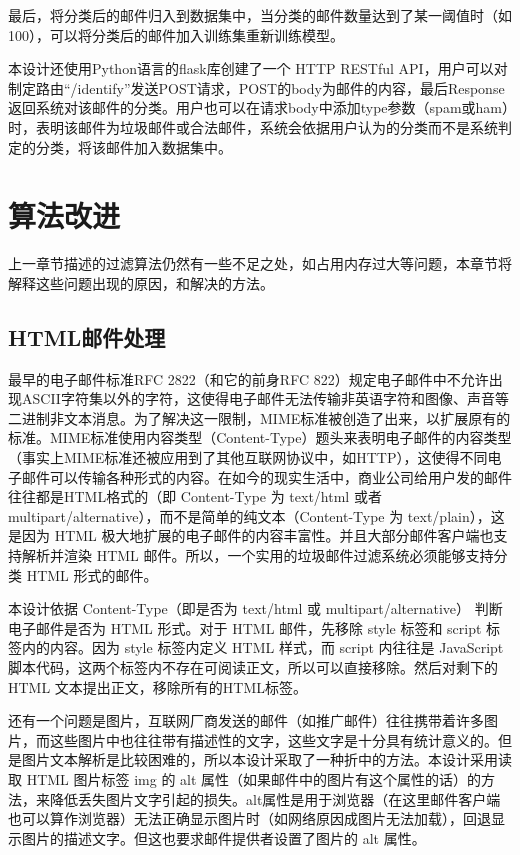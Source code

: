 \documentclass[UTF8,zihao=-4]{ctexart}
\begin{document}
	最后，将分类后的邮件归入到数据集中，当分类的邮件数量达到了某一阈值时（如100），可以将分类后的邮件加入训练集重新训练模型。
	
	本设计还使用Python语言的flask库创建了一个 HTTP RESTful API，用户可以对制定路由“/identify”发送POST请求，POST的body为邮件的内容，最后Response返回系统对该邮件的分类。用户也可以在请求body中添加type参数（spam或ham）时，表明该邮件为垃圾邮件或合法邮件，系统会依据用户认为的分类而不是系统判定的分类，将该邮件加入数据集中。

\newpage
\section{算法改进}
	上一章节描述的过滤算法仍然有一些不足之处，如占用内存过大等问题，本章节将解释这些问题出现的原因，和解决的方法。
\subsection{HTML邮件处理}
	最早的电子邮件标准RFC 2822（和它的前身RFC 822）规定电子邮件中不允许出现ASCII字符集以外的字符，这使得电子邮件无法传输非英语字符和图像、声音等二进制非文本消息。为了解决这一限制，MIME标准被创造了出来，以扩展原有的标准。MIME标准使用内容类型（Content-Type）题头来表明电子邮件的内容类型（事实上MIME标准还被应用到了其他互联网协议中，如HTTP），这使得不同电子邮件可以传输各种形式的内容。在如今的现实生活中，商业公司给用户发的邮件往往都是HTML格式的（即 Content-Type 为 text/html 或者 multipart/alternative），而不是简单的纯文本（Content-Type 为 text/plain），这是因为 HTML 极大地扩展的电子邮件的内容丰富性。并且大部分邮件客户端也支持解析并渲染 HTML 邮件。所以，一个实用的垃圾邮件过滤系统必须能够支持分类 HTML 形式的邮件。
	
	本设计依据 Content-Type（即是否为 text/html 或 multipart/alternative） 判断电子邮件是否为 HTML 形式。对于 HTML 邮件，先移除 style 标签和 script 标签内的内容。因为 style 标签内定义 HTML 样式，而 script 内往往是 JavaScript 脚本代码，这两个标签内不存在可阅读正文，所以可以直接移除。然后对剩下的 HTML 文本提出正文，移除所有的HTML标签。
	
	还有一个问题是图片，互联网厂商发送的邮件（如推广邮件）往往携带着许多图片，而这些图片中也往往带有描述性的文字，这些文字是十分具有统计意义的。但是图片文本解析是比较困难的，所以本设计采取了一种折中的方法。本设计采用读取 HTML 图片标签 img 的 alt 属性（如果邮件中的图片有这个属性的话）的方法，来降低丢失图片文字引起的损失。alt属性是用于浏览器（在这里邮件客户端也可以算作浏览器）无法正确显示图片时（如网络原因成图片无法加载），回退显示图片的描述文字。但这也要求邮件提供者设置了图片的 alt 属性。
\end{document}
